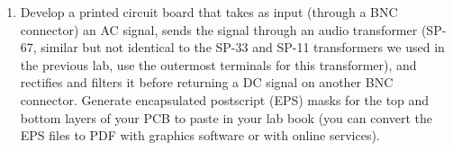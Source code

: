\documentclass{article}
\begin{document}
\begin{enumerate}
\item Develop a printed circuit board that takes as input (through a BNC connector) an AC signal, sends the signal through an audio transformer (SP-67, similar but not identical to the SP-33 and SP-11 transformers we used in the previous lab, use the outermost terminals for this transformer), and rectifies and filters it before returning a DC signal on another BNC connector.  Generate encapsulated postscript (EPS) masks for the top and bottom layers of your PCB to paste in your lab book (you can convert the EPS files to PDF with graphics software or with online services).
\end{enumerate}
\end{document}

